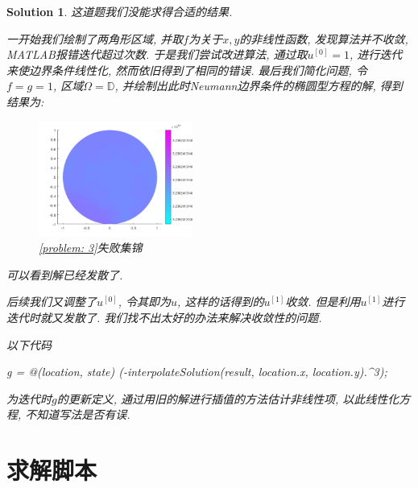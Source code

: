 \documentclass[a4paper, 12pt]{ctexart}
\let\oldlstlisting\lstlisting
\let\oldendlstlisting\endlstlisting
\renewenvironment{lstlisting}
    {\par\nolinenumbers\oldlstlisting}
    {\oldendlstlisting\endnolinenumbers\par}
\theoremstyle{plain}
\theoremstyle{plain}
\theoremstyle{plain}
\theoremstyle{nonumberplain}
\newtheorem{solution}{Solution}
\begin{document}
    \begin{solution}
        这道题我们没能求得合适的结果.

        一开始我们绘制了两角形区域, 并取$f$为关于$x,y$的非线性函数, 发现算法并不收敛, MATLAB报错迭代超过次数. 于是我们尝试改进算法, 通过取$u^{[0]}=1$, 进行迭代来使边界条件线性化, 然而依旧得到了相同的错误. 最后我们简化问题, 令$f=g=1$, 区域$\Omega=\mathbb{D}$, 并绘制出此时Neumann边界条件的椭圆型方程的解, 得到结果为:
        \begin{figure}[H]
            \centering
            \includegraphics[width=0.45\textwidth]{wc31.png}
            \caption{\ref{problem: 3}失败集锦}
        \end{figure}
        可以看到解已经发散了.

        后续我们又调整了$u^{[0]}$, 令其即为$u$, 这样的话得到的$u^{[1]}$收敛. 但是利用$u^{[1]}$进行迭代时就又发散了. 我们找不出太好的办法来解决收敛性的问题.

        以下代码
        \begin{lstlisting}[
            caption=answer,
            style=MATLAB-editor,
            basicstyle=\mlttfamily\scriptsize,
            numberstyle={\color{black!33}\scriptsize\sffamily}
        ]
g = @(location, state) (-interpolateSolution(result, location.x, location.y).^3);
        \end{lstlisting}
        为迭代时$g$的更新定义, 通过用旧的解进行插值的方法估计非线性项, 以此线性化方程, 不知道写法是否有误.
    \end{solution}




    \newpage
    \appendix

    \section{求解脚本}
\end{document}
